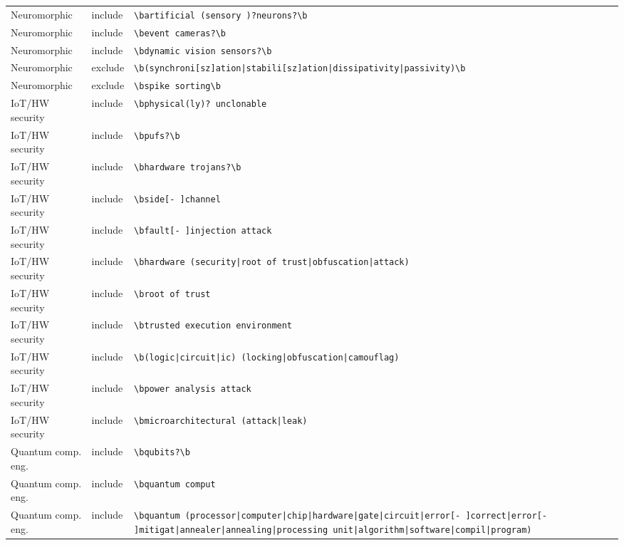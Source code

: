 \documentclass[10pt]{article}
\begin{document}
\begin{longtable}{@{}lL{1.6cm}L{11.5cm}@{}}
Neuromorphic & include & \texttt{\textbackslash{}bartificial \allowbreak(sensory )?neurons?\textbackslash{}b} \\
Neuromorphic & include & \texttt{\textbackslash{}bevent cameras?\textbackslash{}b} \\
Neuromorphic & include & \texttt{\textbackslash{}bdynamic vision sensors?\textbackslash{}b} \\
Neuromorphic & exclude & \texttt{\textbackslash{}b\allowbreak(synchroni[sz]ation\allowbreak|stabili[sz]ation\allowbreak|dissipativity\allowbreak|passivity)\textbackslash{}b} \\
Neuromorphic & exclude & \texttt{\textbackslash{}bspike sorting\textbackslash{}b} \\
IoT/HW security & include & \texttt{\textbackslash{}bphysical\allowbreak(ly)? unclonable} \\
IoT/HW security & include & \texttt{\textbackslash{}bpufs?\textbackslash{}b} \\
IoT/HW security & include & \texttt{\textbackslash{}bhardware trojans?\textbackslash{}b} \\
IoT/HW security & include & \texttt{\textbackslash{}bside[- ]channel} \\
IoT/HW security & include & \texttt{\textbackslash{}bfault[- ]injection attack} \\
IoT/HW security & include & \texttt{\textbackslash{}bhardware \allowbreak(security\allowbreak|root of trust\allowbreak|obfuscation\allowbreak|attack)} \\
IoT/HW security & include & \texttt{\textbackslash{}broot of trust} \\
IoT/HW security & include & \texttt{\textbackslash{}btrusted execution environment} \\
IoT/HW security & include & \texttt{\textbackslash{}b\allowbreak(logic\allowbreak|circuit\allowbreak|ic) \allowbreak(locking\allowbreak|obfuscation\allowbreak|camouflag)} \\
IoT/HW security & include & \texttt{\textbackslash{}bpower analysis attack} \\
IoT/HW security & include & \texttt{\textbackslash{}bmicroarchitectural \allowbreak(attack\allowbreak|leak)} \\
Quantum comp. eng. & include & \texttt{\textbackslash{}bqubits?\textbackslash{}b} \\
Quantum comp. eng. & include & \texttt{\textbackslash{}bquantum comput} \\
Quantum comp. eng. & include & \texttt{\textbackslash{}bquantum \allowbreak(processor\allowbreak|computer\allowbreak|chip\allowbreak|hardware\allowbreak|gate\allowbreak|circuit\allowbreak|error[- ]correct\allowbreak|error[- ]mitigat\allowbreak|annealer\allowbreak|annealing\allowbreak|processing unit\allowbreak|algorithm\allowbreak|software\allowbreak|compil\allowbreak|program)} \\

\end{longtable}
\end{document}
